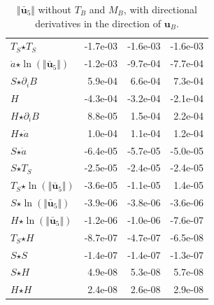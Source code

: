 \begin{table}[H]
\begin{tabular}{l|r|r|r}
  $T_S$$ \star $$T_S$ & -1.7e-03 & -1.6e-03 & -1.6e-03 \\
  $\dot{a}$$ \star $$\ln\left( \Vert \bar{\mathbf{u}}_{5} \Vert \right)$ & -1.2e-03 & -9.7e-04 & -7.7e-04 \\
  $S$$ \star $$\partial_i B$ & 5.9e-04 & 6.6e-04 & 7.3e-04 \\
  $H$ & -4.3e-04 & -3.2e-04 & -2.1e-04 \\
  $H$$ \star $$\partial_i B$ & 8.8e-05 & 1.5e-04 & 2.2e-04 \\
  $H$$ \star $$\dot{a}$ & 1.0e-04 & 1.1e-04 & 1.2e-04 \\
  $S$$ \star $$\dot{a}$ & -6.4e-05 & -5.7e-05 & -5.0e-05 \\
  $S$$ \star $$T_S$ & -2.5e-05 & -2.4e-05 & -2.4e-05 \\
  \color{red}$T_S$$ \star $$\ln\left( \Vert \bar{\mathbf{u}}_{5} \Vert \right)$ & \color{red}-3.6e-05 & \color{red}-1.1e-05 & \color{red}1.4e-05 \\
  $S$$ \star $$\ln\left( \Vert \bar{\mathbf{u}}_{5} \Vert \right)$ & -3.9e-06 & -3.8e-06 & -3.6e-06 \\
  $H$$ \star $$\ln\left( \Vert \bar{\mathbf{u}}_{5} \Vert \right)$ & -1.2e-06 & -1.0e-06 & -7.6e-07 \\
  $T_S$$ \star $$H$ & -8.7e-07 & -4.7e-07 & -6.5e-08 \\
  $S$$ \star $$S$ & -1.4e-07 & -1.4e-07 & -1.3e-07 \\
  $S$$ \star $$H$ & 4.9e-08 & 5.3e-08 & 5.7e-08 \\
  $H$$ \star $$H$ & 2.4e-08 & 2.6e-08 & 2.9e-08 \\
\end{tabular}
  \caption[]{\normalsize $\Vert \mathbf{\bar{u}}_5 \Vert$ without $T_B$ and $M_B$, with directional derivatives in the direction of $\mathbf{u}_B$.}
\end{table}


